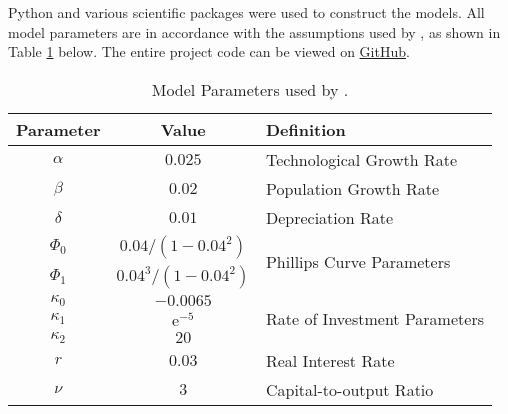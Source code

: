 \documentclass[12pt, centerh1]{article}
\begin{document}
Python \citep{rossum1995python} and various scientific packages were used to construct the models. All model parameters are in accordance with the assumptions used by \citet{grasselli2012analysis}, as shown in Table \ref{tab:parameters} below. The entire project code can be viewed on \href{https://github.com/grantwforsythe/math3mb3}{GitHub}.
\begin{table}[!h]
\caption{Model Parameters used by \citet{grasselli2012analysis}.}
\label{tab:parameters}
\centering
\begin{tabular}{|c|c|l|}
\hline
\textbf{Parameter }     & \textbf{Value}            & \textbf{Definition}                       \\
\hline
$\alpha$                & $0.025$                   & Technological Growth Rate                 \\
$\beta$                 & $0.02$                    & Population Growth Rate                    \\
$\delta$                & $0.01$                    & Depreciation Rate                 \\ \hline
$\Phi_0$                & $0.04/(1-0.04^2)$         & \multirow{2}{*}{Phillips Curve Parameters}\\
$\Phi_1$                & $0.04^3/(1-0.04^2)$       & ~                                 \\ \hline
$\kappa_0$             & $-0.0065$                 & \multirow{3}{*}{Rate of Investment Parameters}   \\
$\kappa_1$              & $\mathrm e^{-5}$          & ~                                         \\
$\kappa_2$              & $20$                      & ~                                 \\ \hline
$r$                     & $0.03$                    & Real Interest Rate                        \\
$\nu$                   & $3$                       & Capital-to-output Ratio                   \\
\hline
\end{tabular}
\end{table}
\end{document}
